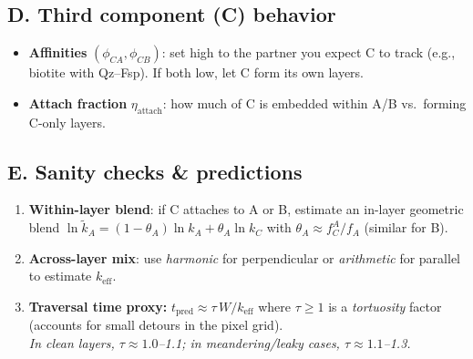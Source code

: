 \documentclass[11pt,a4paper]{article}
\begin{document}
\subsection*{D. Third component (C) behavior}
\begin{itemize}[leftmargin=*]
\item \textbf{Affinities} $(\phi_{CA},\phi_{CB})$: set high to the partner you expect C to track (e.g., biotite with Qz--Fsp). If both low, let C form its own layers.
\item \textbf{Attach fraction} $\eta_{\text{attach}}$: how much of C is embedded within A/B vs.\ forming C-only layers.
\end{itemize}

\subsection*{E. Sanity checks \& predictions}
\begin{enumerate}[leftmargin=*]
\item \textbf{Within-layer blend}: if C attaches to A or B, estimate an in-layer geometric blend
$\ln \tilde{k}_A=(1-\theta_A)\ln k_A+\theta_A \ln k_C$ with $\theta_A\approx f_C^{A}/f_A$ (similar for B).
\item \textbf{Across-layer mix}: use \emph{harmonic} for perpendicular or \emph{arithmetic} for parallel to estimate $k_{\text{eff}}$.
\item \textbf{Traversal time proxy:} $t_{\text{pred}}\approx \tau\,W/k_{\text{eff}}$ where $\tau\!\ge\!1$ is a \emph{tortuosity} factor (accounts for small detours in the pixel grid).\\
\emph{In clean layers, $\tau\!\approx\!1.0$--1.1; in meandering/leaky cases, $\tau\!\approx\!1.1$--1.3.}
\end{enumerate}

\end{document}

